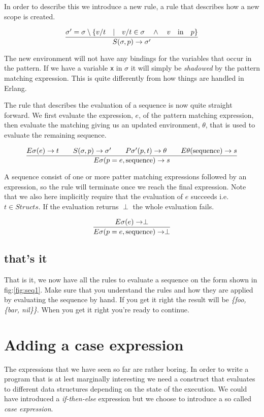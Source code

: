 \documentclass[a4paper,11pt]{article}
\begin{document}
In order to describe this we introduce a new rule, a rule that
describes how a new scope is created.

$$\frac{\sigma' = \sigma \setminus \lbrace v/t \quad | \quad v/t \in \sigma \quad \wedge \quad  v \quad {\rm in} \quad p\rbrace}{S(\sigma, p) \rightarrow \sigma'}$$

The new environment will not have any bindings for the variables that
occur in the pattern. If we have a variable {\tt x} in $\sigma$ it
will simply be {\em shadowed} by the pattern matching expression.
This is quite differently from how things are handled in 
Erlang.

The rule that describes the evaluation of a sequence is now quite
straight forward. We first evaluate the expression, $e$, of the
pattern matching expression, then evaluate the matching giving us an
updated environment, $\theta$, that is used to evaluate the remaining
sequence. 

$$\frac{   
  E\sigma(e) \rightarrow t
  \qquad S(\sigma, p) \rightarrow \sigma'
  \qquad P\sigma'(p, t) \rightarrow \theta
  \qquad E\theta({\rm sequence}) \rightarrow s
}{E\sigma(p = e, {\rm sequence}) \rightarrow s}$$ 

A sequence consist of one or more patter matching expressions followed
by an expression, so the rule will terminate once we reach the final
expression. Note that we also here implicitly require that the
evaluation of $e$ succeeds i.e. $t \in Structs$. If the evaluation
returns $\perp$ the whole evaluation fails.


$$\frac{   
  E\sigma(e) \rightarrow \perp
}{E\sigma(p = e, {\rm sequence}) \rightarrow \perp}$$ 


\subsection{that's it}

That is it, we now have all the rules to evaluate a sequence on the
form shown in fig:\ref{fig:seq1}. Make sure that you understand
the rules and how they are applied by evaluating the sequence by
hand. If you get it right the result will be {\em \{foo, \{bar,
  nil\}\}}. When you get it right you're ready to continue.


\section{Adding a case expression}

The expressions that we have seen so far are rather boring. In order to
write a program that is at lest marginally interesting we need a
construct that evaluates to different data structures depending on the
state of the execution. We could have introduced a {\em if-then-else}
expression but we choose to introduce a so called {\em case expression}.
\end{document}
